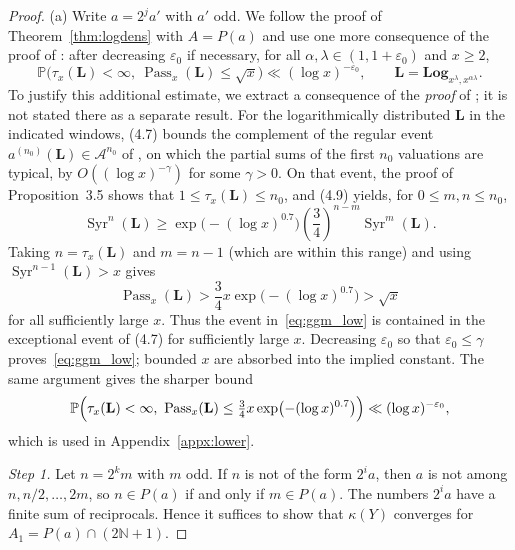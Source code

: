 \documentclass[12pt]{amsart}
\theoremstyle{definition}
\theoremstyle{remark}
\newcommand{\N}{\mathbb{N}}
\begin{document}
\begin{proof}
(a) Write $a=2^ja'$ with $a'$ odd. We follow the proof of Theorem~\ref{thm:logdens} with $A=P(a)$ and use one more consequence of the proof of \cite[Proposition~3.5]{GGM_2025}: after decreasing $\varepsilon_0$ if necessary, for all $\alpha,\lambda\in(1,1+\varepsilon_0)$ and $x\ge2$,
\begin{equation}
\label{eq:ggm_low}
\mathbb P\bigl(\tau_x(\mathbf L)<\infty,\ \operatorname{Pass}_x(\mathbf L)\le\sqrt x\bigr)\ll(\log x)^{-\varepsilon_0},\qquad\mathbf L=\mathbf{Log}_{x^\lambda,x^{\alpha\lambda}}.
\end{equation}
To justify this additional estimate, we extract a consequence of the \emph{proof} of \cite[Proposition~3.5, especially (4.7)--(4.9)]{GGM_2025}; it is not stated there as a separate result. For the logarithmically distributed $\mathbf L$ in the indicated windows, (4.7) bounds the complement of the regular event $a^{(n_0)}(\mathbf L)\in\mathcal A^{n_0}$ of \cite{GGM_2025}, on which the partial sums of the first $n_0$ valuations are typical, by $O((\log x)^{-\gamma})$ for some $\gamma>0$. On that event, the proof of Proposition~3.5 shows that $1\le\tau_x(\mathbf L)\le n_0$, and (4.9) yields, for $0\le m,n\le n_0$,
\[
 \operatorname{Syr}^n(\mathbf L)\ge \exp\!\bigl(- (\log x)^{0.7}\bigr)
 \left(\frac{3}{4}\right)^{n-m}\operatorname{Syr}^m(\mathbf L).
\]
Taking $n=\tau_x(\mathbf L)$ and $m=n-1$ (which are within this range) and using $\operatorname{Syr}^{n-1}(\mathbf L)>x$ gives
\[
 \operatorname{Pass}_x(\mathbf L)>
 \frac34 x\exp\!\bigl(-(\log x)^{0.7}\bigr)>\sqrt{x}
\]
for all sufficiently large $x$. Thus the event in~\eqref{eq:ggm_low} is contained in the exceptional event of (4.7) for sufficiently large $x$. Decreasing $\varepsilon_0$ so that $\varepsilon_0\le\gamma$ proves~\eqref{eq:ggm_low}; bounded $x$ are absorbed into the implied constant. The same argument gives the sharper bound
\begin{equation}
\label{eq:ggm_low2}
\mathbb P\Bigl(\tau_x(\mathbf L)<\infty,\ \operatorname{Pass}_x(\mathbf L)\le\tfrac34x\exp\bigl(-(\log x)^{0.7}\bigr)\Bigr)\ll(\log x)^{-\varepsilon_0},
\end{equation}
which is used in Appendix~\ref{appx:lower}.

\emph{Step 1.} Let $n=2^km$ with $m$ odd. If $n$ is not of the form $2^ia$, then $a$ is not among $n,n/2,\dots,2m$, so $n\in P(a)$ if and only if $m\in P(a)$. The numbers $2^ia$ have a finite sum of reciprocals. Hence it suffices to show that $\kappa(Y)$ converges for $A_1=P(a)\cap(2\N+1)$.


\end{proof}
\end{document}
